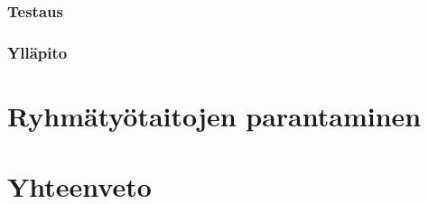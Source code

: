 \documentclass[finnish]{../tktltiki2}
\theoremstyle{definition}
\theoremstyle{remark}
\begin{document}
\subsubsection{Testaus}
\subsubsection{Ylläpito}

\section{Ryhmätyötaitojen parantaminen}

\section{Yhteenveto}


%
%
% 
%



\end{document}
